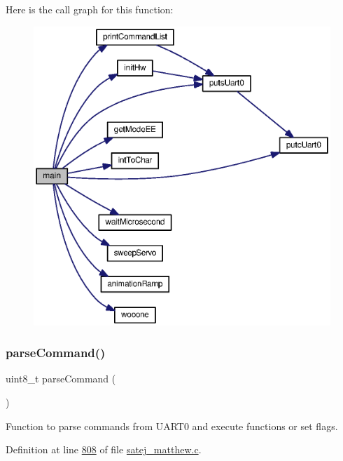 Here is the call graph for this function\+:\nopagebreak
\begin{figure}[H]
\begin{center}
\leavevmode
\includegraphics[width=350pt]{satej__matthew_8c_a922afd31fa147cb51a9b28ce18b3e30e_cgraph}
\end{center}
\end{figure}
\mbox{\label{satej__matthew_8c_a784ef656236362513864c6ba3507e22d}} 
\subsubsection{\texorpdfstring{parseCommand()}{parseCommand()}}
{\footnotesize\ttfamily uint8\+\_\+t parse\+Command (\begin{DoxyParamCaption}{ }\end{DoxyParamCaption})}



Function to parse commands from U\+A\+R\+T0 and execute functions or set flags. 



Definition at line \mbox{\hyperlink{satej__matthew_8c_source_l00808}{808}} of file \mbox{\hyperlink{satej__matthew_8c_source}{satej\+\_\+matthew.\+c}}.

